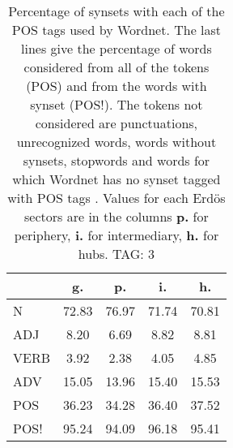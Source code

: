 \begin{table}[h!]
\begin{center}
\begin{tabular}{| l | c | c | c | c |}\hline
 & g. & p. & i. & h. \\\hline
N & 72.83  & 76.97  & 71.74  & 70.81 \\\hline
ADJ & 8.20  & 6.69  & 8.82  & 8.81 \\\hline
VERB & 3.92  & 2.38  & 4.05  & 4.85 \\\hline
ADV & 15.05  & 13.96  & 15.40  & 15.53 \\\hline
POS & 36.23  & 34.28  & 36.40  & 37.52 \\\hline
POS! & 95.24  & 94.09  & 96.18  & 95.41 \\\hline
\end{tabular}
\caption{Percentage of synsets with each of the POS tags used by Wordnet. The last lines give the percentage of words considered from all of the tokens (POS) and from the words with synset (POS!). The tokens not considered are punctuations, unrecognized words, words without synsets, stopwords and words for which Wordnet has no synset  tagged with POS tags . Values for each Erd\"os sectors are in the columns {{\bf p.}} for periphery, {{\bf i.}} for intermediary, {{\bf h.}} for hubs. TAG: 3}
\end{center}
\end{table}